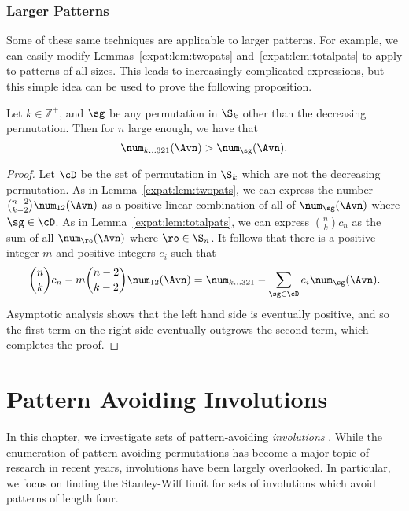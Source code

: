\documentclass[12pt,twoside]{memoir}
\begin{document}
  \subsection{Larger Patterns}

    Some of these same techniques are applicable to larger patterns.  For
    example, we can easily modify Lemmas~\ref{expat:lem:twopats}
    and~\ref{expat:lem:totalpats} to apply to patterns of all sizes. This leads to
    increasingly complicated expressions, but this simple idea can be used to
    prove the following proposition. 

    \begin{proposition}
      Let $k \in \mathbb{Z}^+$, and $\sg$ be any permutation in $\S_k$
      other than the decreasing permutation. Then for $n$ large enough,
      we have that
      $$\num_{k \dots 3 2 1}(\Avn) > \num_{\sg}(\Avn).$$
    \end{proposition}

    \begin{proof}
      Let $\cD$ be the set of permutation in $\S_k$ which are not the
      decreasing permutation.  As in Lemma~\ref{expat:lem:twopats},  we can
      express the number $\binom{n-2}{k-2}\num_{12}(\Avn)$ as a positive linear
      combination of all of $\num_{\sg} (\Avn)$ where $\sg \in \cD$. As in
      Lemma~\ref{expat:lem:totalpats}, we can express $\binom{n}{k} c_n$ as the sum
      of all $\num_{\ro} (\Avn)$ where $\ro \in \S_n$.  It follows that there is
      a positive integer $m$ and positive
      integers $e_i$ such that
      $$ \binom{n}{k} c_n - m\binom{n-2}{k-2} \num_{12} (\Avn) = \num_{k \dots
      321} - \sum_{\sg \in \cD} e_i \num_{\sg} (\Avn).$$ Asymptotic analysis
      shows that the left hand side is eventually positive, and so the first term
      on the right side eventually outgrows the second term, which completes the
      proof.
    \end{proof}




\cleardoublepage
\typeout{******************}
\typeout{******************}

  \chapter{Pattern Avoiding Involutions} 
  \label{chap:involutions}

    In this chapter, we investigate sets of pattern-avoiding \emph{involutions}
    . While the enumeration of pattern-avoiding permutations
    has become a major topic of research in recent years, involutions have been
    largely overlooked.  In particular, we focus on finding the Stanley-Wilf
    limit for sets of involutions which avoid patterns of length four. 
    
\end{document}
